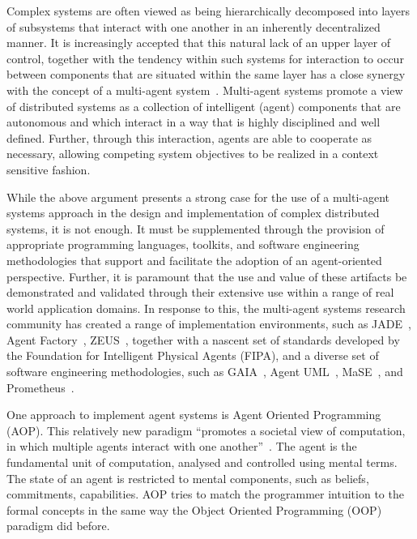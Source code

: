 \documentclass[a4paper,12pt,oneside]{book} %
\theoremstyle{remark}
\theoremstyle{plain}
\begin{document}
Complex systems are often viewed as being hierarchically decomposed into layers
of subsystems that interact with one another in an inherently decentralized
manner. It is increasingly accepted that this natural lack of an upper layer of
control, together with the tendency within such systems for interaction to
occur between components that are situated within the same layer has a close
synergy with the concept of a multi-agent
system~\cite{Jennings00agent-orientedsoftware}. Multi-agent systems promote a
view of distributed systems as a collection of intelligent (agent) components
that are autonomous and which interact in a way that is highly disciplined and
well defined. Further, through this interaction, agents are able to cooperate
as necessary, allowing competing system objectives to be realized in a context
sensitive fashion.

While the above argument presents a strong case for the use of a multi-agent
systems approach in the design and implementation of complex distributed
systems, it is not enough. It must be supplemented through the provision of
appropriate programming languages, toolkits, and software engineering
methodologies that support and facilitate the adoption of an agent-oriented
perspective. Further, it is paramount that the use and value of these artifacts
be demonstrated and validated through their extensive use within a range of
real world application domains. In response to this, the multi-agent systems
research community has created a range of implementation environments, such as
JADE~\cite{DBLP:books/sp/map2005/BellifemineBCP05}, Agent
Factory~\cite{collier1999agent}, ZEUS~\cite{DBLP:conf/agents/NwanaNLC99},
together with a nascent set of standards developed by the Foundation for
Intelligent Physical Agents (FIPA), and a diverse set of software engineering
methodologies, such as GAIA~\cite{DBLP:journals/aamas/WooldridgeJK00}, Agent
UML~\cite{bauer2001agent}, MaSE~\cite{deloach2001analysis}, and
Prometheus~\cite{DBLP:conf/atal/PadghamW02}.

One approach to implement agent systems is Agent Oriented Programming (AOP).
This relatively new paradigm ``promotes a societal view of computation, in which
multiple agents interact with one another''~\cite{DBLP:journals/ai/Shoham93}.
The agent is the fundamental unit of computation, analysed and controlled using
mental terms.  The state of an agent is restricted to mental components, such
as beliefs, commitments, capabilities. AOP tries to match the programmer
intuition to the formal concepts in the same way the Object Oriented
Programming (OOP) paradigm did before.
\end{document}
